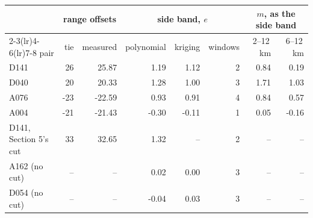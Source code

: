 \begin{tabular}{lrrrrrrr}
\toprule
 & \multicolumn{2}{c}{range offsets} & \multicolumn{3}{c}{side band, $e$} & \multicolumn{2}{c}{$m$, as the side band} \\
\cmidrule(lr){2-3}\cmidrule(lr){4-6}\cmidrule(lr){7-8}
pair & tie & measured & polynomial & kriging & windows & 2--12\,km & 6--12\,km \\
\midrule
D141 & 26 & 25.87 & 1.19 & 1.12 & 2 & 0.84 & 0.19 \\
D040 & 20 & 20.33 & 1.28 & 1.00 & 3 & 1.71 & 1.03 \\
A076 & -23 & -22.59 & 0.93 & 0.91 & 4 & 0.84 & 0.57 \\
A004 & -21 & -21.43 & -0.30 & -0.11 & 1 & 0.05 & -0.16 \\
D141, Section 5's cut & 33 & 32.65 & 1.32 & -- & 2 & -- & -- \\
A162 (no cut) & -- & -- & 0.02 & 0.00 & 3 & -- & -- \\
D054 (no cut) & -- & -- & -0.04 & 0.03 & 3 & -- & -- \\
\bottomrule
\end{tabular}
